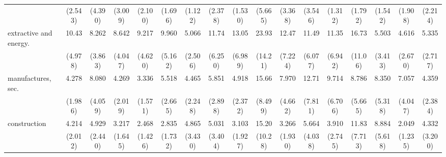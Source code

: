 {\begin{tabular}{l*{16}{c}}
                    &     (2.543)         &     (4.390)         &     (3.009)         &     (2.100)         &     (1.696)         &     (1.122)         &     (2.378)         &     (1.530)         &     (5.665)         &     (3.368)         &     (3.546)         &     (1.312)         &     (1.792)         &     (1.542)         &     (1.908)         &     (2.214)         \\
[1em]
extractive and energy.&       10.43\sym{***}&       8.262\sym{***}&       8.642\sym{***}&       9.217\sym{***}&       9.960\sym{***}&       5.066\sym{**} &       11.74\sym{***}&       13.05\sym{***}&       23.93\sym{***}&       12.47\sym{***}&       11.49\sym{***}&       11.35\sym{***}&       16.73\sym{***}&       5.503\sym{**} &       4.616\sym{**} &       5.335\sym{**} \\
                    &     (4.978)         &     (3.863)         &     (4.047)         &     (4.620)         &     (5.162)         &     (2.506)         &     (6.250)         &     (6.989)         &     (14.21)         &     (7.224)         &     (6.077)         &     (6.942)         &     (11.06)         &     (3.413)         &     (2.670)         &     (2.717)         \\
[1em]
manufactures, sec.  &       4.278\sym{**} &       8.080\sym{***}&       4.269\sym{**} &       3.336\sym{*}  &       5.518\sym{***}&       4.465\sym{**} &       5.851\sym{***}&       4.918\sym{***}&       15.66\sym{***}&       7.970\sym{***}&       12.71\sym{***}&       9.714\sym{***}&       8.786\sym{***}&       8.350\sym{***}&       7.057\sym{***}&       4.359\sym{**} \\
                    &     (1.986)         &     (4.059)         &     (2.019)         &     (1.571)         &     (2.665)         &     (2.248)         &     (2.898)         &     (2.372)         &     (8.499)         &     (4.662)         &     (7.811)         &     (6.706)         &     (5.665)         &     (5.318)         &     (4.047)         &     (2.384)         \\
[1em]
construction        &       4.214\sym{**} &       4.929\sym{**} &       3.217\sym{*}  &       2.468         &       2.835         &       4.865\sym{*}  &       5.031\sym{*}  &       3.103         &       15.20\sym{***}&       3.266\sym{*}  &       5.664\sym{*}  &       3.910         &       11.83\sym{***}&       8.884\sym{***}&       2.049         &       4.332\sym{*}  \\
                    &     (2.012)         &     (2.440)         &     (1.645)         &     (1.426)         &     (1.732)         &     (3.430)         &     (3.404)         &     (1.927)         &     (10.28)         &     (1.930)         &     (4.038)         &     (2.745)         &     (7.713)         &     (5.618)         &     (1.235)         &     (3.200)         \\

\end{tabular}}
